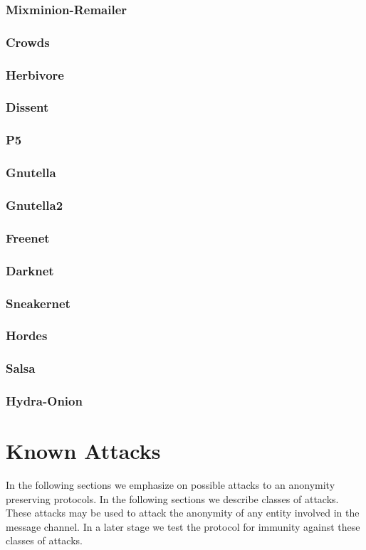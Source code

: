 \subsubsection{Mixminion-Remailer}
\subsubsection{Crowds}
\subsubsection{Herbivore}
\subsubsection{Dissent}
\subsubsection{P5}
\subsubsection{Gnutella}
\subsubsection{Gnutella2}
\subsubsection{Freenet}
\subsubsection{Darknet}
\subsubsection{Sneakernet}
\subsubsection{Hordes}
\subsubsection{Salsa}
\subsubsection{Hydra-Onion}

\section{Known Attacks}
In the following sections we emphasize on possible attacks to an anonymity preserving protocols. In the following sections we describe classes of attacks. These attacks may be used to attack the anonymity of any entity involved in the message channel. In a later stage we test the protocol for immunity against these classes of attacks.

